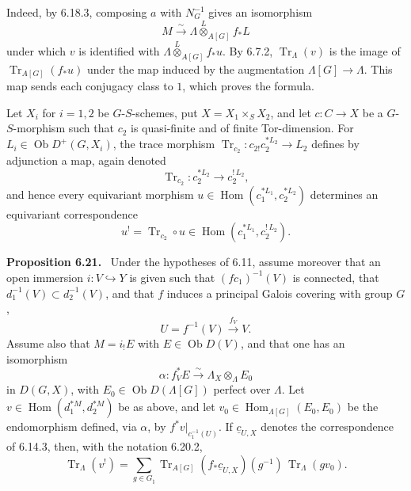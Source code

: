 \documentclass[11pt]{article}
\theoremstyle{plain}
\theoremstyle{definition}
\theoremstyle{remark}
\newenvironment{statement}[1]{\par\medskip\noindent\textbf{#1.}\ }{\par\medskip}
\DeclareMathOperator{\Hom}{Hom}
\DeclareMathOperator{\ob}{Ob}
\DeclareMathOperator{\Tr}{Tr}
\begin{document}
Indeed, by 6.18.3, composing $a$ with $N_G^{-1}$ gives an isomorphism
\[
       M\xrightarrow{\sim}\Lambda\overset{L}{\otimes}_{A[G]}f_*L
\]
under which $v$ is identified with $\Lambda\overset{L}{\otimes}_{A[G]}f_*u$. By
6.7.2, $\Tr_\Lambda(v)$ is the image of $\Tr_{A[G]}(f_*u)$ under the map induced
by the augmentation $\Lambda[G]\to\Lambda$. This map sends each conjugacy class
to $1$, which proves the formula.

Let $X_i$ for $i=1,2$ be $G$-$S$-schemes, put $X=X_1\times_S X_2$, and let
$c:C\to X$ be a $G$-$S$-morphism such that $c_2$ is quasi-finite and of finite
Tor-dimension. For $L_i\in\ob D^+(G,X_i)$, the trace morphism
$\Tr_{c_2}:c_{2!}c_2^{*L_2}\to L_2$ defines by adjunction a map, again denoted
\begin{equation}\tag{6.20.1}
      \Tr_{c_2}:c_2^{*L_2}\longrightarrow c_2^{!\,L_2},
\end{equation}
and hence every equivariant morphism
$u\in\Hom(c_1^{*L_1},c_2^{*L_2})$ determines an equivariant correspondence
\begin{equation}\tag{6.20.2}
      u^!=\Tr_{c_2}\circ u\in\Hom(c_1^{*L_1},c_2^{!\,L_2}).
\end{equation}

\begin{statement}{Proposition 6.21}
Under the hypotheses of 6.11, assume moreover that an open immersion
$i:V\hookrightarrow Y$ is given such that $(fc_1)^{-1}(V)$ is connected, that
$d_1^{-1}(V)\subset d_2^{-1}(V)$, and that $f$ induces a principal Galois covering
with group $G$,
\[
      U=f^{-1}(V)\xrightarrow{f_V}V.
\]
Assume also that $M=i_!E$ with $E\in\ob D(V)$, and that one has an isomorphism
\[
      \alpha:f_V^*E\xrightarrow{\sim}\Lambda_X\otimes_\Lambda E_0
\]
in $D(G,X)$, with $E_0\in\ob D(\Lambda[G])$ perfect over $\Lambda$. Let
$v\in\Hom(d_1^{*M},d_2^{*M})$ be as above, and let
$v_0\in\Hom_{\Lambda[G]}(E_0,E_0)$ be the endomorphism defined, via $\alpha$, by
$f^*v|_{c_1^{-1}(U)}$. If $\underline c_{U,X}$ denotes the correspondence of
6.14.3, then, with the notation 6.20.2,
\begin{equation}\tag{6.23.1}
\Tr_\Lambda(v^!)=
\sum_{g\in G_\natural}
\Tr_{A[G]}(f_*\underline c_{U,X})(g^{-1})\,\Tr_\Lambda(gv_0).
\end{equation}
\end{statement}
\end{document}
